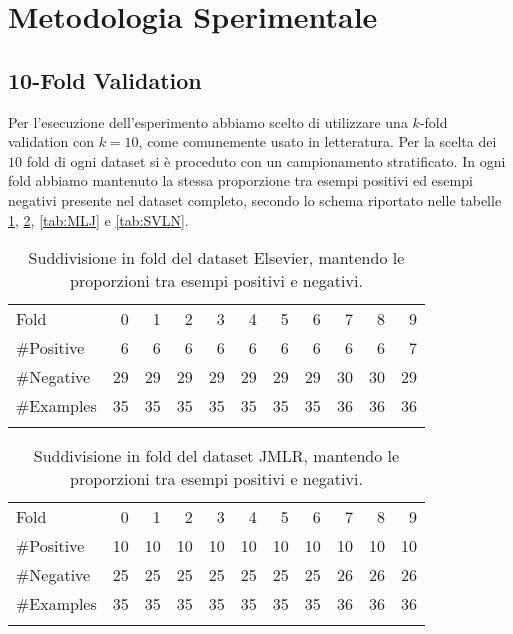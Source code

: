 \section{Metodologia Sperimentale}


\subsection{10-Fold Validation}

Per l'esecuzione dell'esperimento abbiamo scelto di utilizzare una $k$-fold validation con $k=10$, come comunemente usato in letteratura.
Per la scelta dei $10$ fold di ogni dataset si è proceduto con un campionamento stratificato. In ogni fold abbiamo mantenuto la stessa proporzione tra esempi positivi ed esempi negativi presente nel dataset completo, secondo lo schema riportato nelle tabelle  \ref{tab:Elsevier}, \ref{tab:JMLR}, \ref{tab:MLJ} e \ref{tab:SVLN}.

\begin{table}[h!tbp]
	\centering
		\begin{tabular}{l@{\qquad}*{10}{r}}
		\toprule
\addlinespace
			Fold &  0 &  1 &  2 &  3 &  4 &  5 &  6 &  7 &  8 &  9 \\
\addlinespace
\midrule
\addlinespace
\#Positive  & 6  & 6  &  6 &  6 &  6 &  6 &  6 &  6 &  6 &  7 \\
\#Negative  & 29 & 29 & 29 & 29 & 29 & 29 & 29 & 30 & 30 & 29 \\
\#Examples & 35 & 35 & 35 & 35 & 35 & 35 & 35 & 36 & 36 & 36 \\
\addlinespace
\bottomrule
		\end{tabular}
		\caption[Elsevier: suddivisione in fold.]{Suddivisione in fold del dataset Elsevier, mantendo le proporzioni tra esempi positivi e negativi.}
	\label{tab:Elsevier}
\end{table}

\begin{table}[h!tbp]
\centering
\begin{tabular}{l@{\qquad}*{10}{r}}
		\toprule
\addlinespace
Fold &  0 &  1 &  2 &  3 &  4 &  5 &  6 &  7 &  8 &  9 \\
\addlinespace
\midrule
\addlinespace
\#Positive  & 10  & 10  &  10 &  10 &  10 &  10 &  10 &  10 &  10 &  10 \\
\#Negative  & 25 & 25 & 25 & 25 & 25 & 25 & 25 & 26 & 26 & 26 \\
\#Examples  & 35 & 35 & 35 & 35 & 35 & 35 & 35 & 36 & 36 & 36 \\
\addlinespace
\bottomrule
\end{tabular}
		\caption[JMLR: suddivisione in fold.]{Suddivisione in fold del dataset JMLR, mantendo le proporzioni tra esempi positivi e negativi.}
	\label{tab:JMLR}
\end{table}


